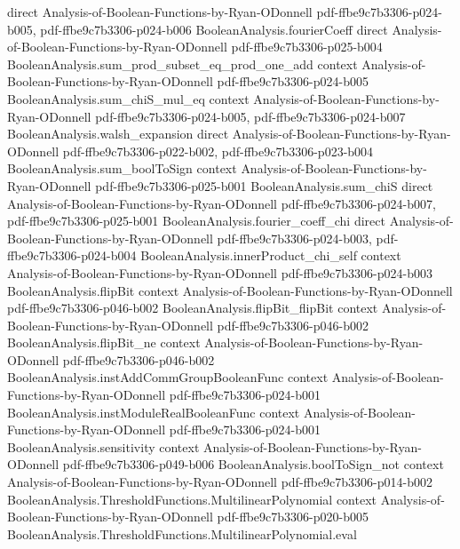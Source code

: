 \begin{lemma}
  {direct}
  {Analysis-of-Boolean-Functions-by-Ryan-ODonnell}
  {pdf-ffbe9c7b3306-p024-b005,
    pdf-ffbe9c7b3306-p024-b006}
\proofstep
  {BooleanAnalysis.fourierCoeff}
  {direct}
  {Analysis-of-Boolean-Functions-by-Ryan-ODonnell}
  {pdf-ffbe9c7b3306-p025-b004}
\proofstep
  {BooleanAnalysis.sum_prod_subset_eq_prod_one_add}
  {context}
  {Analysis-of-Boolean-Functions-by-Ryan-ODonnell}
  {pdf-ffbe9c7b3306-p024-b005}
\proofstep
  {BooleanAnalysis.sum_chiS_mul_eq}
  {context}
  {Analysis-of-Boolean-Functions-by-Ryan-ODonnell}
  {pdf-ffbe9c7b3306-p024-b005,
    pdf-ffbe9c7b3306-p024-b007}
\proofstep
  {BooleanAnalysis.walsh_expansion}
  {direct}
  {Analysis-of-Boolean-Functions-by-Ryan-ODonnell}
  {pdf-ffbe9c7b3306-p022-b002,
    pdf-ffbe9c7b3306-p023-b004}
\proofstep
  {BooleanAnalysis.sum_boolToSign}
  {context}
  {Analysis-of-Boolean-Functions-by-Ryan-ODonnell}
  {pdf-ffbe9c7b3306-p025-b001}
\proofstep
  {BooleanAnalysis.sum_chiS}
  {direct}
  {Analysis-of-Boolean-Functions-by-Ryan-ODonnell}
  {pdf-ffbe9c7b3306-p024-b007,
    pdf-ffbe9c7b3306-p025-b001}
\proofstep
  {BooleanAnalysis.fourier_coeff_chi}
  {direct}
  {Analysis-of-Boolean-Functions-by-Ryan-ODonnell}
  {pdf-ffbe9c7b3306-p024-b003,
    pdf-ffbe9c7b3306-p024-b004}
\proofstep
  {BooleanAnalysis.innerProduct_chi_self}
  {context}
  {Analysis-of-Boolean-Functions-by-Ryan-ODonnell}
  {pdf-ffbe9c7b3306-p024-b003}
\proofstep
  {BooleanAnalysis.flipBit}
  {context}
  {Analysis-of-Boolean-Functions-by-Ryan-ODonnell}
  {pdf-ffbe9c7b3306-p046-b002}
\proofstep
  {BooleanAnalysis.flipBit_flipBit}
  {context}
  {Analysis-of-Boolean-Functions-by-Ryan-ODonnell}
  {pdf-ffbe9c7b3306-p046-b002}
\proofstep
  {BooleanAnalysis.flipBit_ne}
  {context}
  {Analysis-of-Boolean-Functions-by-Ryan-ODonnell}
  {pdf-ffbe9c7b3306-p046-b002}
\proofstep
  {BooleanAnalysis.instAddCommGroupBooleanFunc}
  {context}
  {Analysis-of-Boolean-Functions-by-Ryan-ODonnell}
  {pdf-ffbe9c7b3306-p024-b001}
\proofstep
  {BooleanAnalysis.instModuleRealBooleanFunc}
  {context}
  {Analysis-of-Boolean-Functions-by-Ryan-ODonnell}
  {pdf-ffbe9c7b3306-p024-b001}
\proofstep
  {BooleanAnalysis.sensitivity}
  {context}
  {Analysis-of-Boolean-Functions-by-Ryan-ODonnell}
  {pdf-ffbe9c7b3306-p049-b006}
\proofstep
  {BooleanAnalysis.boolToSign_not}
  {context}
  {Analysis-of-Boolean-Functions-by-Ryan-ODonnell}
  {pdf-ffbe9c7b3306-p014-b002}
\proofstep
  {BooleanAnalysis.ThresholdFunctions.MultilinearPolynomial}
  {context}
  {Analysis-of-Boolean-Functions-by-Ryan-ODonnell}
  {pdf-ffbe9c7b3306-p020-b005}
\proofstep
  {BooleanAnalysis.ThresholdFunctions.MultilinearPolynomial.eval}

\end{lemma}
